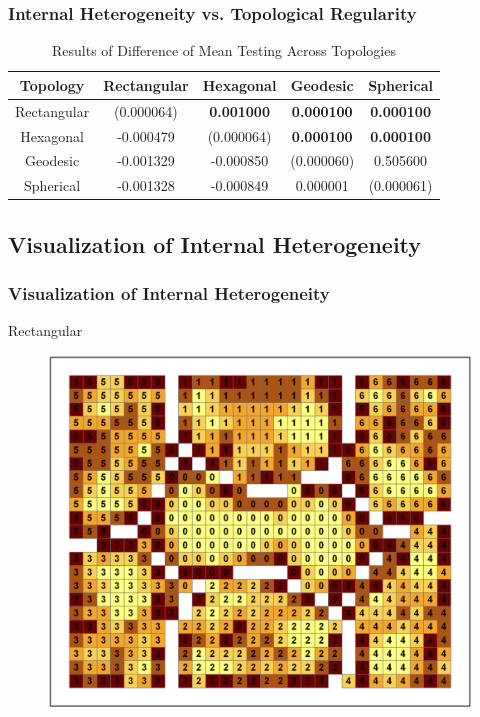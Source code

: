 \documentclass[nototal,handout]{beamer}
\begin{document}
\begin{frame}
	\frametitle{Internal Heterogeneity vs. Topological Regularity}
  \begin{table}
    \begin{minipage}{\textwidth}
    \caption{Results of Difference of Mean Testing Across Topologies}
    \label{rlt:all}
    \begin{tabular}{|c||c|c|c|c|}
    \hline
    \textbf{Topology}&Rectangular				&Hexagonal &Geodesic &Spherical\\\hline
    \hline
 		Rectangular & (0.000064) & \textbf{0.001000} & \textbf{0.000100} & \textbf{0.000100}\\\hline
 		Hexagonal & -0.000479 & (0.000064) & \textbf{0.000100} & \textbf{0.000100}\\\hline
 		Geodesic & -0.001329 & -0.000850 & (0.000060) & 0.505600\\\hline
 		Spherical & -0.001328 & -0.000849 & 0.000001 & (0.000061)\\\hline
 
    \end{tabular}
    \end{minipage}
  \end{table}
 \end{frame} 

\subsection{Visualization of Internal Heterogeneity} 

\begin{frame}
	\frametitle{Visualization of Internal Heterogeneity}
 
\begin{block}{Rectangular}
  \begin{center}
  \begin{figure}
  \includegraphics[width=0.70\linewidth]{rook_clusters.png}
  \end{figure}
  \end{center}
 \end{block} \end{frame} 
\end{document}
